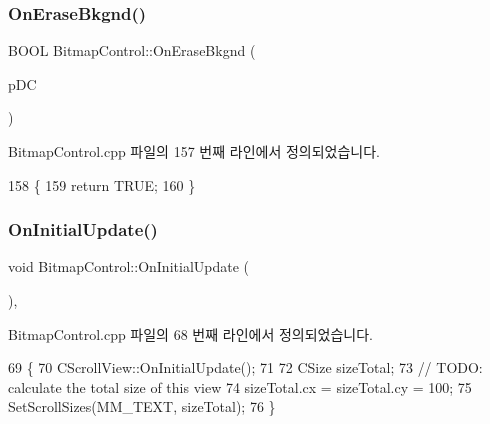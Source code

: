\subsubsection{\texorpdfstring{On\+Erase\+Bkgnd()}{OnEraseBkgnd()}}
{\footnotesize\ttfamily B\+O\+OL Bitmap\+Control\+::\+On\+Erase\+Bkgnd (\begin{DoxyParamCaption}\item[{C\+DC $\ast$}]{p\+DC }\end{DoxyParamCaption})\hspace{0.3cm}{\ttfamily [protected]}}



Bitmap\+Control.\+cpp 파일의 157 번째 라인에서 정의되었습니다.


\begin{DoxyCode}
158 \{
159   \textcolor{keywordflow}{return} TRUE;
160 \}
\end{DoxyCode}
\mbox{\label{class_bitmap_control_a532fd9e0bd31674589a224737960bfc0}} 
\subsubsection{\texorpdfstring{On\+Initial\+Update()}{OnInitialUpdate()}}
{\footnotesize\ttfamily void Bitmap\+Control\+::\+On\+Initial\+Update (\begin{DoxyParamCaption}{ }\end{DoxyParamCaption})\hspace{0.3cm}{\ttfamily [protected]}, {\ttfamily [virtual]}}



Bitmap\+Control.\+cpp 파일의 68 번째 라인에서 정의되었습니다.


\begin{DoxyCode}
69 \{
70   CScrollView::OnInitialUpdate();
71 
72   CSize sizeTotal;
73   \textcolor{comment}{// TODO: calculate the total size of this view}
74   sizeTotal.cx = sizeTotal.cy = 100;
75   SetScrollSizes(MM\_TEXT, sizeTotal);
76 \}
\end{DoxyCode}
\mbox{\label{class_bitmap_control_a2958d0209f702d4207d10797c8aa86bd}} 
